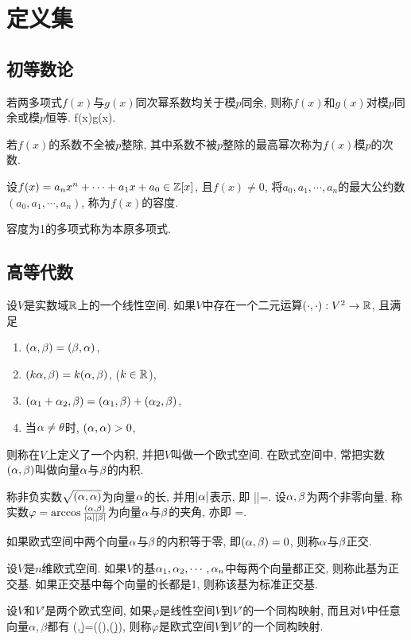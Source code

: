 \chapter{定义集}

\section{初等数论}
若两多项式$f(x)$与$g(x)$同次幂系数均关于模$p$同余, 则称$f(x)$和$g(x)$对模$p$同余或模$p$恒等.
\bee
f(x)\equiv g(x).
\eee
\ed

若$f(x)$的系数不全被$p$整除, 其中系数不被$p$整除的最高幂次称为$f(x)$模$p$的次数.
\ed

设$f(x)=a_nx^n+\cdots+a_1x+a_0\in\Bbb Z[x]$, 且$f(x)\ne0$, 将$a_0,a_1,\cdots,a_n$的最大公约数$(a_0,a_1,\cdots,a_n)$, 称为$f(x)$的容度.

容度为1的多项式称为本原多项式.
\ed

\section{高等代数}
设$V$是实数域$\mathbb{R}$上的一个线性空间. 如果$V$中存在一个二元运算$(\cdot,\cdot): V^2\to\mathbb{R}$, 且满足
\begin{enumerate}[1.]
 \item $(\alpha,\beta)=(\beta,\alpha)$,
 \item $(k\alpha,\beta)=k(\alpha,\beta)$, ($k\in\mathbb{R}$),
 \item $(\alpha_1+\alpha_2,\beta)=(\alpha_1,\beta)+(\alpha_2,\beta)$,
 \item 当$\alpha\ne\theta$时, $(\alpha,\alpha)>0$,
\end{enumerate}
则称在$V$上定义了一个内积, 并把$V$叫做一个欧式空间.
在欧式空间中, 常把实数$(\alpha,\beta)$叫做向量$\alpha$与$\beta$的内积.
\ed

\bd{}{}
称非负实数$\sqrt{(\alpha,\alpha)}$为向量$\alpha$的长, 并用$|\alpha|$表示,
即
\bee
|\a|=\sqrt{(\a,\a)}.
\eee
设$\alpha,\beta$为两个非零向量, 称实数$\varphi=\arccos\frac{(\alpha,\beta)}{|\alpha||\beta|}$为向量$\alpha$与$\beta$的夹角, 亦即
\bee
\cos\varphi=\frac{(\a,\b)}{|\a||\b|}.
\eee
\ed

如果欧式空间中两个向量$\alpha$与$\beta$的内积等于零, 即$(\alpha, \beta)=0$, 
则称$\alpha$与$\beta$正交.
\ed

\bd{}{}
设$V$是$n$维欧式空间. 如果$V$的基$\alpha_1,\alpha_2,\cdots,\alpha_n$中每两个向量都正交, 
则称此基为正交基.
如果正交基中每个向量的长都是1, 则称该基为标准正交基.
\ed

设$V$和$V'$是两个欧式空间, 如果$\varphi$是线性空间$V$到$V'$的一个同构映射,
而且对$V$中任意向量$\alpha,\beta$都有
\bee
(\a,\b)=(\varphi(\a),\varphi(\b)),
\eee
则称$\varphi$是欧式空间$V$到$V'$的一个同构映射.

